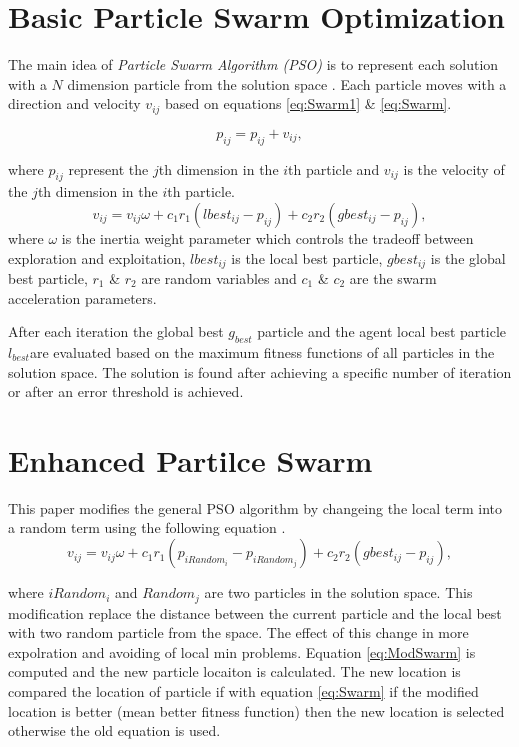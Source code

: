 \documentclass[10pt]{article}
\begin{document}
 

\section{Basic Particle Swarm Optimization}
\label{sec:ParticleSwarmAlgorithm}
 The main idea of \textit{Particle Swarm Algorithm (PSO)} is to represent each solution with a $N$ dimension particle from the solution space \cite{PSOFirst}. Each particle moves with a direction and velocity $v_{ij}$ based on equations \ref{eq:Swarm1} \& \ref{eq:Swarm}.

\begin{equation}
p_{ij}=p_{ij}+v_{ij},
\label{eq:Swarm1}
\end{equation}
 
where $p_{ij}$ represent the $j$th dimension in the $i$th particle and $v_{ij}$ is the velocity of the $j$th dimension in the $i$th particle.
 \begin{equation}
v_{ij}  = v_{ij} \omega + c_1 r_1 (lbest_{ij}  - p_{ij} ) + c_2 r_2 (gbest_{ij}  - p_{ij} ),
\label{eq:Swarm}
\end{equation}
 where $\omega$ is the inertia weight parameter which controls the tradeoff between exploration and exploitation,  $lbest_{ij}$ is the local best particle, $gbest_{ij}$ is the global best particle, $r_1$ \& $r_2$ are random variables and $c_1$ \& $c_2$ are the swarm acceleration parameters.

 After each iteration the global best $g_{best}$ particle and the agent local best particle $l_{best}$are evaluated based on the maximum fitness functions of all particles in the solution space. The solution is found after achieving a specific number of iteration or after an error threshold is achieved.

\section{Enhanced Partilce Swarm}
This paper modifies the general PSO algorithm by changeing the local term into a random term using the following equation .  
  \begin{equation}
  v_{ij}  = v_{ij} \omega + c_1 r_1 (p_{iRandom_i}  - p_{iRandom_j} ) + c_2 r_2 (gbest_{ij}  - p_{ij} ),
  \label{eq:ModSwarm}
  \end{equation}

where $iRandom_i$ and $Random_j$ are two particles in the solution space. This modification replace the distance between the current particle and the local best with two random particle from the space. The effect of this change in more expolration and avoiding of local min problems. Equation \ref{eq:ModSwarm} is computed and the new particle locaiton is calculated. The new location is compared the location of particle if with equation \ref{eq:Swarm} if the modified location is better (mean better fitness function) then the new location is selected otherwise the old equation is used. 
\end{document}
